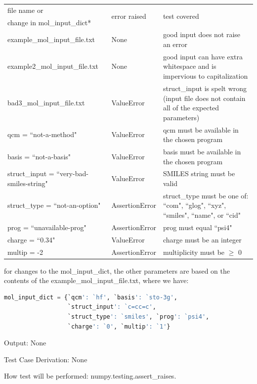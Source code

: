 \documentclass[12pt, titlepage]{article}
\begin{document}
\begin{enumerate}
\begin{table}[H]
	\begin{tabularx}{\textwidth}{p{5cm}p{3cm}p{6.5cm}}
		\toprule
		file name or & \multirow{2}{*}{error raised} & \multirow{2}{*}{test 
			covered} \\
		change in mol\_input\_dict*& & \\
		\midrule
		example\_mol\_input\_file.txt & None & good input does not raise an 
		error \\
		example2\_mol\_input\_file.txt & None & good input can have extra 
		whitespace and is impervious to capitalization \\
		bad3\_mol\_input\_file.txt & ValueError & struct\_input is spelt wrong 
		(input file does not contain all of the expected parameters) \\
		qcm = ``not-a-method" & ValueError & qcm must be available in the 
		chosen program \\
		basis = ``not-a-basis" & ValueError & basis must be available in the 
		chosen program \\
		struct\_input = ``very-bad-smiles-string" & ValueError & SMILES string 
		must be valid \\
		struct\_type = ``not-an-option" & AssertionError & struct\_type must be 
		one of: ``com", ``glog", ``xyz", ``smiles", ``name", or ``cid" \\
		prog = ``unavailable-prog" & AssertionError & prog must equal ``psi4" \\
		charge = ``0.34" & ValueError & charge must be an integer \\
		multip = -2 & AssertionError & multiplicity must be $\geq$ 0 \\
	\end{tabularx}
\end{table}

\noindent * for changes to the mol\_input\_dict, the other parameters are based 
on the contents of the example\_mol\_input\_file.txt, where we have:
\begin{lstlisting}[language=python, showstringspaces=false]
mol_input_dict = {`qcm': `hf', `basis': `sto-3g',
                  `struct_input': `c=cc=c',
                  `struct_type': `smiles', `prog': `psi4',
                  `charge': `0', `multip': `1'}
\end{lstlisting}

Output: None

Test Case Derivation: None

How test will be performed: numpy.testing.assert\_raises.
	
\end{enumerate}
\end{document}
